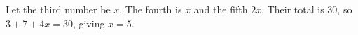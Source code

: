 Let the third number be $x$. The fourth is $x$ and the fifth $2x$. Their total is 30, so $3+7+4x=30$, giving $\boxed{x=5}$.
